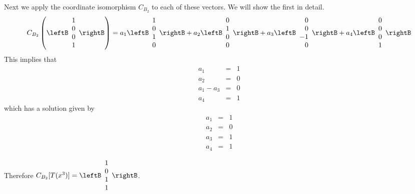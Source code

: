 \begin{solution}
Next we apply the coordinate isomorphism $C_{B_2}$ to each of these vectors. We will show the first in detail. 
\[
C_{B_2} \left( \leftB \begin{array}{c}
1 \\
0 \\
0 \\
1 
\end{array} \rightB \right) = a_1 \leftB \begin{array}{r}
1 \\
0 \\
1 \\
0
\end{array} \rightB + a_2  \leftB \begin{array}{r}
0 \\
1 \\
0 \\
0
\end{array} \rightB + a_3 
\leftB \begin{array}{r}
0 \\
0 \\
-1 \\
0
\end{array} \rightB + a_4 
\leftB \begin{array}{r}
0 \\
0 \\
0 \\
1
\end{array} \rightB \]
This implies that
\begin{eqnarray*}
a_1 &=& 1 \\
a_2 &=& 0 \\
a_1 - a_3 &=& 0 \\
a_4 &=& 1 
\end{eqnarray*} 
which has a solution given by 
\begin{eqnarray*}
a_1 &=& 1 \\
a_2 &=& 0 \\
a_3 &=& 1 \\
a_4 &=& 1 
\end{eqnarray*} 

Therefore $C_{B_2} [T(x^3)] = \leftB \begin{array}{r} 
1 \\
0 \\
1 \\
1
\end{array} \rightB$. 


\end{solution}
